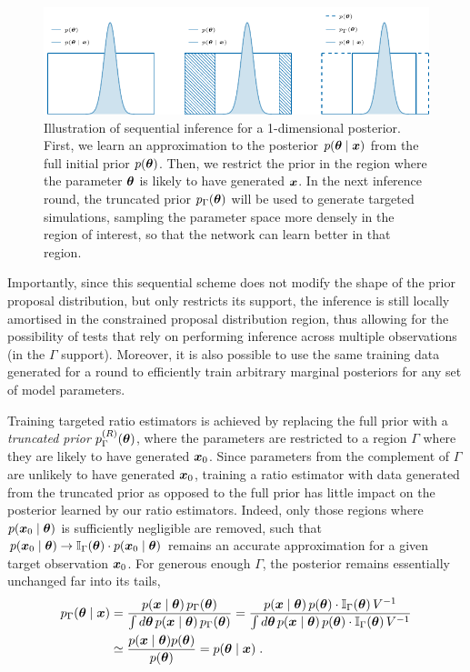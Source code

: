 \begin{figure}
	\centering
	\includegraphics[width=\linewidth]{TikZ/truncation.pdf}
	\caption{Illustration of sequential inference for a 1-dimensional posterior. First, we learn an approximation to the posterior $p(\bm{\theta}\mid\bm{x})$ from the full initial prior $p(\bm{\theta})$. Then, we restrict the prior in the region where the parameter $\bm{\theta}$ is likely to have generated $\bm{x}$. In the next inference round, the truncated prior $p_\Gamma(\bm{\theta})$ will be used to generate targeted simulations, sampling the parameter space more densely in the region of interest, so that the network can learn better in that region.}
	\label{fig:sbi-truncation}
\end{figure}

Importantly, since this sequential scheme does not modify the shape of the prior proposal distribution, but only restricts its support, the inference is still locally amortised in the constrained proposal distribution region, thus allowing for the possibility of tests that rely on performing inference across multiple observations (in the $\Gamma$ support). Moreover, it is also possible to use the same training data generated for a round to efficiently train arbitrary marginal posteriors for any set of model parameters. 

Training targeted ratio estimators is achieved by replacing the full prior with a \emph{truncated prior} $p^{(R)}_{\Gamma}(\bm{\theta})$, where the parameters are restricted to a region $\Gamma$ where they are likely to have generated $\bm{x}_0$. Since parameters from the complement of $\Gamma$ are unlikely to have generated $\bm{x}_0$, training a ratio estimator with data generated from the truncated prior as opposed to the full prior has little impact on the posterior learned by our ratio estimators. Indeed, only those regions where $p(\bm{x}_0 \mid\bm{\theta})$ is sufficiently negligible are removed, such that $p(\bm{x}_0\mid\bm{\theta}) \to \mathbb{I}_\Gamma(\bm{\theta}) \cdot p(\bm{x}_0\mid\bm{\theta})$ remains an accurate approximation for a given target observation $\bm{x}_0$. For generous enough $\Gamma$, the posterior remains essentially unchanged far into its tails,
\begin{equation}
\begin{split}
    p_\Gamma(\bm{\theta}\mid\bm{x}) 
    &= \frac{p(\bm{x}\mid\bm{\theta})\,p_\Gamma(\bm{\theta})}{\int d\bm{\theta}\, p(\bm{x}\mid\bm{\theta})\, p_\Gamma(\bm{\theta})}
    = \frac{p(\bm{x}\mid\bm{\theta})\,p(\bm{\theta})\cdot\mathbb{I}_\Gamma(\bm{\theta})\, V^{-1}}
    {\int d\bm{\theta}\, p(\bm{x}\mid\bm{\theta})\,p(\bm{\theta})\cdot \mathbb{I}_\Gamma(\bm{\theta})\, V^{-1}} \\
    &\simeq \frac{p(\bm{x}\mid\bm{\theta})p(\bm{\theta})}{p(\bm{\theta})}
    = p(\bm{\theta}\mid\bm{x}) \;. 
\end{split}
\end{equation}

